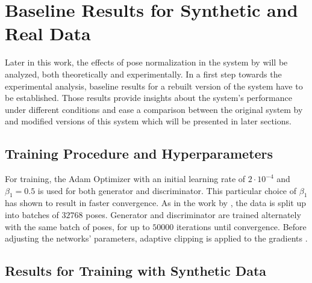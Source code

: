 \section{Baseline Results for Synthetic and Real Data}
\label{sec:evaluation}

Later in this work, the effects of pose normalization in the system by \citet{drover18} will be analyzed, both theoretically and experimentally.
In a first step towards the experimental analysis, baseline results for a rebuilt version of the system have to be established.
Those results provide insights about the system's performance under different conditions and ease a comparison between the original system by \citet{drover18} and modified versions of this system which will be presented in later sections.

\subsection{Training Procedure and Hyperparameters}
For training, the Adam Optimizer \cite{kingma17} with an initial learning rate of $2 \cdot 10^{-4}$ and $\beta_1 = 0.5$ is used for both generator and discriminator.
This particular choice of $\beta_1$ has shown to result in faster convergence.
As in the work by \citet{drover18}, the data is split up into batches of $32768$ poses.
Generator and discriminator are trained alternately with the same batch of poses, for up to $50000$ iterations until convergence.
Before adjusting the networks' parameters, adaptive clipping is applied to the gradients \cite[Section~3.2.1]{chorowski14}.


\subsection{Results for Training with Synthetic Data}

